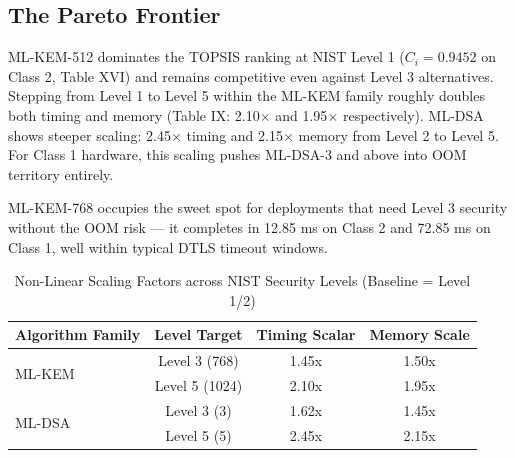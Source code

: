 \begin{table}[htbp]
\caption{Cross-Study Hardware Result Validation}
\label{tab:validation}
\centering
{}
\end{table}

\subsection{The Pareto Frontier}

ML-KEM-512 dominates the TOPSIS ranking at NIST Level 1 ($C_i = 0.9452$ on Class 2, Table XVI) and remains competitive even against Level 3 alternatives. Stepping from Level 1 to Level 5 within the ML-KEM family roughly doubles both timing and memory (Table IX: 2.10$\times$ and 1.95$\times$ respectively). ML-DSA shows steeper scaling: 2.45$\times$ timing and 2.15$\times$ memory from Level 2 to Level 5. For Class 1 hardware, this scaling pushes ML-DSA-3 and above into OOM territory entirely.

ML-KEM-768 occupies the sweet spot for deployments that need Level 3 security without the OOM risk — it completes in 12.85 ms on Class 2 and 72.85 ms on Class 1, well within typical DTLS timeout windows.

\begin{table}[htbp]
\caption{Non-Linear Scaling Factors across NIST Security Levels (Baseline = Level 1/2)}
\label{tab:scaling_factor}
\centering
\begin{tabular}{lccc}
\toprule
\textbf{Algorithm Family} & \textbf{Level Target} & \textbf{Timing Scalar} & \textbf{Memory Scale} \\
\midrule
\multirow{2}{*}{ML-KEM} & Level 3 (768) & 1.45x & 1.50x \\
& Level 5 (1024) & 2.10x & 1.95x \\
\midrule
\multirow{2}{*}{ML-DSA} & Level 3 (3) & 1.62x & 1.45x \\
& Level 5 (5) & 2.45x & 2.15x \\
\bottomrule
\end{tabular}
\end{table}

